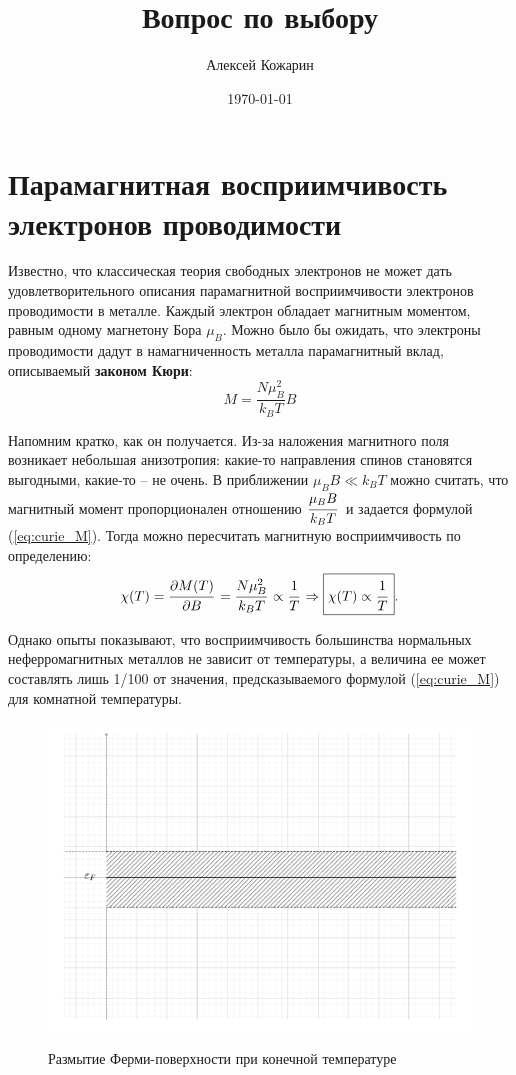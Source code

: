 \documentclass[a4paper, 12pt, openany]{book}
\title{Вопрос по выбору}
\author{Алексей Кожарин}
\date{\today}
\begin{document}
	
	
	\section{Парамагнитная восприимчивость электронов проводимости}
    Известно, что классическая теория свободных электронов не может дать удовлетворительного описания парамагнитной восприимчивости электронов проводимости в металле. 
    Каждый электрон обладает магнитным моментом, равным одному магнетону Бора $\mu_B$.
    Можно было бы ожидать, что электроны проводимости дадут в намагниченность металла парамагнитный вклад, описываемый \textbf{законом Кюри}:
    \begin{equation}
        \label{eq:curie_M}
        M=\frac{N \mu_{B}^{2}}{k_{B} T} B
    \end{equation}

    Напомним кратко, как он получается.
    Из-за наложения магнитного поля возникает небольшая анизотропия: какие-то направления спинов становятся выгодными, какие-то -- не очень.
    В приближении $\mu_B B \ll k_{B}T$ можно считать, что магнитный момент пропорционален отношению $\cfrac{\mu_{B}B}{k_{B}T}\, $ и задается формулой (\ref{eq:curie_M}).
    Тогда можно пересчитать магнитную восприимчивость по определению:
    \begin{equation*}
        \chi (T) = \cfrac{\partial M (T)}{\partial B}\, =
        \cfrac{N \mu_{B}^2}{k_{B}T}\, \propto \cfrac{1}{T}\,
        \Rightarrow \boxed{\chi (T) \propto \cfrac{1}{T}\, } .
    \end{equation*}

    Однако опыты показывают, что восприимчивость большинства нормальных неферромагнитных металлов не зависит от температуры,
    а величина ее может составлять лишь 1/100 от значения, предсказываемого формулой (\ref{eq:curie_M}) для комнатной температуры.

    \begin{figure}
        \includegraphics[width=\linewidth]{fermi_razm}
        \label{fig:fermi_razm}
        \caption{Размытие Ферми-поверхности при конечной температуре}
    \end{figure}
\end{document}
